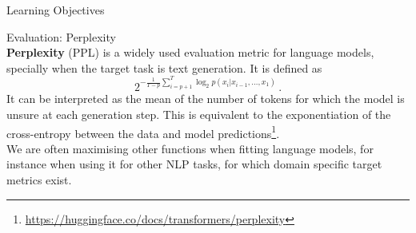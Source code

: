 \documentclass[9pt]{beamer}
\begin{document}
\begin{frame}{Learning Objectives}
\end{frame}


\begin{frame}{Evaluation: Perplexity}
    \vspace{0.3cm}\\
    \textbf{Perplexity} (PPL) is a widely used evaluation metric for language models, specially when the target task is text generation. It is defined as 
    $$ 2^{-\frac{1}{T-p}\sum^T_{i=p+1}\log_2p(x_i|x_{i-1},\dots,x_1)} \,.$$
    It can be interpreted as the mean of the number of tokens for which the model is unsure at each generation step. This is equivalent to the exponentiation of the cross-entropy between the data and model predictions\footnote{\url{https://huggingface.co/docs/transformers/perplexity}}.
    \vspace{0.3cm}\\
    We are often maximising other functions when fitting language models, for instance when using it for other NLP tasks, for which domain specific target metrics exist.
\end{frame}
\end{document}
